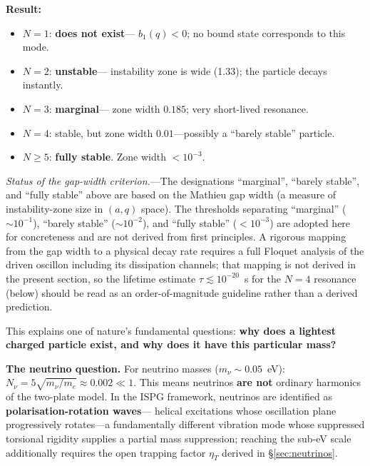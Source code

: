 \documentclass[11pt]{article}
\begin{document}
\textbf{Result:}
\begin{itemize}
  \item $N = 1$: \textbf{does not exist}---
    $b_1(q) < 0$; no bound state corresponds to this mode.
  \item $N = 2$: \textbf{unstable}---
    instability zone is wide (1.33);
    the particle decays instantly.
  \item $N = 3$: \textbf{marginal}---
    zone width $0.185$; very short-lived resonance.
  \item $N = 4$: stable, but
    zone width $0.01$---possibly a
    ``barely stable'' particle.
  \item $N \geq 5$: \textbf{fully stable}.
    Zone width $< 10^{-3}$.
\end{itemize}

\textit{Status of the gap-width criterion.}---The
designations ``marginal'', ``barely stable'', and ``fully
stable'' above are based on the Mathieu gap width (a
measure of instability-zone size in $(a,q)$ space).  The
thresholds separating ``marginal'' ($\sim\!10^{-1}$),
``barely stable'' ($\sim\!10^{-2}$), and ``fully stable''
($<\!10^{-3}$) are adopted here for concreteness and are
not derived from first principles.  A rigorous mapping
from the gap width to a physical decay rate requires a
full Floquet analysis of the driven oscillon including
its dissipation channels; that mapping is not derived in
the present section, so the lifetime estimate $\tau
\lesssim 10^{-20}$~s for the $N=4$ resonance (below) should
be read as an order-of-magnitude guideline rather than a
derived prediction.

\begin{center}
\end{center}

This explains one of nature's fundamental questions:
\textbf{why does a lightest charged particle exist, and why
does it have this particular mass?}

\medskip
\textbf{The neutrino question.}
For neutrino masses ($m_\nu \sim 0.05$~eV):
$N_\nu = 5\sqrt{m_\nu/m_e} \approx 0.002 \ll 1$.
This means neutrinos \textbf{are not} ordinary harmonics
of the two-plate model.  In the ISPG framework, neutrinos
are identified as \textbf{polarisation-rotation waves}---%
helical excitations whose oscillation plane progressively
rotates---a fundamentally different vibration mode whose
suppressed torsional rigidity supplies a partial mass
suppression; reaching the sub-eV scale additionally requires
the open trapping factor $\eta_T$ derived in
\S\ref{sec:neutrinos}.
\end{document}

